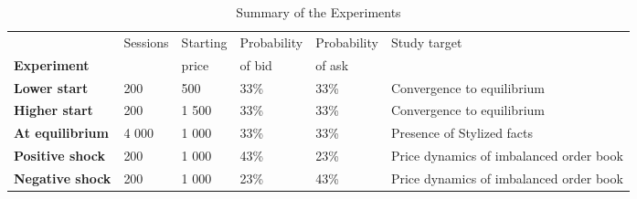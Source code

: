 
\begin{table}[ht]
    \centering
    
    \caption{Summary of the Experiments}
    \label{tbl:experiment_summary}

    \begin{adjustbox}{width=1\textwidth}
    \begin{tabular}{lllllp{4cm}}
        \toprule
        {} & Sessions & Starting & Probability & Probability &                                            Study target \\
        \textbf{Experiment             } &  &    price      &       of bid          &       of ask          &                                                    \\
        \midrule
        \textbf{Lower start } &     200  &           500  &                33\% &                33\% &                Convergence to equilibrium \\
        \midrule
        \textbf{Higher start} &     200  &         1 500  &                33\% &                33\% &                Convergence to equilibrium \\
        \midrule
        \textbf{At equilibrium         } &   4 000  &         1 000  &                33\% &                33\% &  Presence of Stylized facts \\
        \midrule
        \textbf{Positive shock         } &     200  &         1 000  &                43\% &                23\% &  Price dynamics of imbalanced order book \\
        \midrule
        \textbf{Negative shock         } &     200  &         1 000  &                23\% &                43\% &  Price dynamics of imbalanced order book \\
        \bottomrule
    
    \end{tabular}

\end{adjustbox}
\end{table} 
